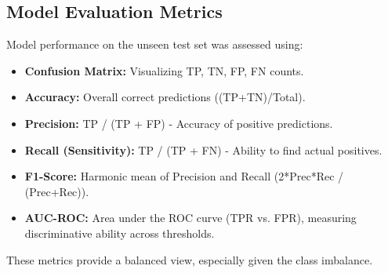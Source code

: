 \documentclass[conference]{IEEEtran}
\begin{document}
\subsection{Model Evaluation Metrics}
Model performance on the unseen test set was assessed using:
\begin{itemize}
    \item \textbf{Confusion Matrix:} Visualizing TP, TN, FP, FN counts.
    \item \textbf{Accuracy:} Overall correct predictions ((TP+TN)/Total).
    \item \textbf{Precision:} TP / (TP + FP) - Accuracy of positive predictions.
    \item \textbf{Recall (Sensitivity):} TP / (TP + FN) - Ability to find actual positives.
    \item \textbf{F1-Score:} Harmonic mean of Precision and Recall (2*Prec*Rec / (Prec+Rec)).
    \item \textbf{AUC-ROC:} Area under the ROC curve (TPR vs. FPR), measuring discriminative ability across thresholds.
\end{itemize}
These metrics provide a balanced view, especially given the class imbalance.

\end{document}
